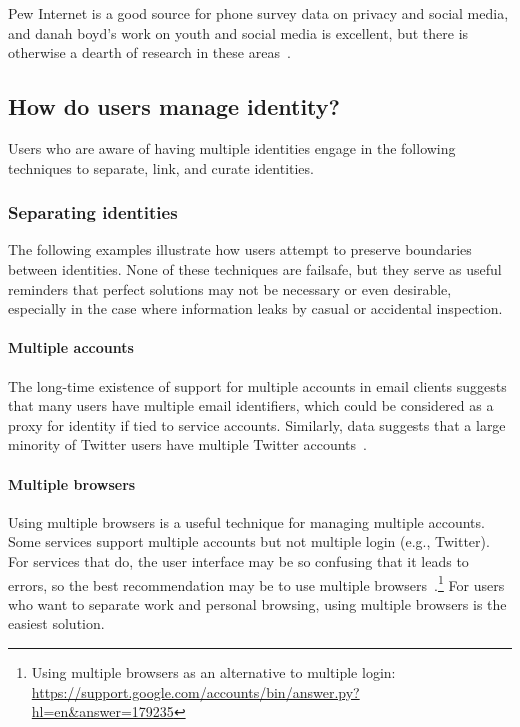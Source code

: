 \documentclass[10pt, conference, compsocconf]{IEEEtran}
\begin{document}
Pew Internet is a good source for phone survey data on privacy and social
media, and danah boyd's work on youth and social media is excellent, but there
is otherwise a dearth of research in these areas~\cite{boyd,pew1,pew2,pew3}.

\subsection{How do users manage identity?}

Users who are aware of having multiple identities engage in the following
techniques to separate, link, and curate identities.

\subsubsection{Separating identities}

The following examples illustrate how users attempt to preserve boundaries
between identities. None of these techniques are failsafe, but they serve as
useful reminders that perfect solutions may not be necessary or even desirable,
especially in the case where information leaks by casual or accidental
inspection.

\paragraph{Multiple accounts}
The long-time existence of support for multiple accounts in email clients
suggests that many users have multiple email identifiers, which could be
considered as a proxy for identity if tied to service accounts. Similarly, data
suggests that a large minority of Twitter users have multiple Twitter
accounts~\cite{twitter}.

\paragraph{Multiple browsers}

Using multiple browsers is a useful technique for managing multiple accounts.
Some services support multiple accounts but not multiple login (e.g.,
Twitter). For services that do, the user interface
may be so confusing that it leads to errors, so the best recommendation may be
to use multiple browsers~\cite{yegge}.\footnote{Using multiple
browsers as an alternative to multiple login:
\url{https://support.google.com/accounts/bin/answer.py?hl=en&answer=179235}}
For users who want to separate work and
personal browsing, using multiple browsers is the easiest solution.
\end{document}
